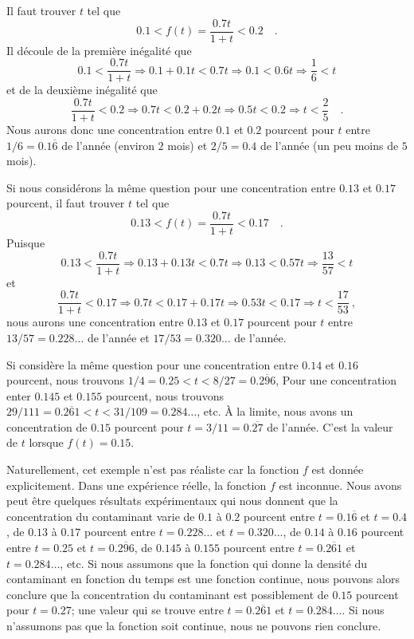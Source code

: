 {\begin{egg}[\life]
Il faut trouver $t$ tel que
\[
  0.1 < f(t) = \frac{0.7t}{1+t} < 0.2 \quad .
\]
Il découle de la première inégalité que
\[
  0.1 < \frac{0.7t}{1+t} \Rightarrow 0.1 + 0.1 t < 0.7 t
  \Rightarrow 0.1 < 0.6 t \Rightarrow \frac{1}{6} < t
\]
et de la deuxième inégalité que
\[
  \frac{0.7t}{1+t} < 0.2 \Rightarrow 0.7 t < 0.2 + 0.2 t
  \Rightarrow 0.5 t < 0.2 \Rightarrow t < \frac{2}{5} \quad .
\]
Nous aurons donc une concentration entre $0.1$ et $0.2$ pourcent pour
$t$ entre $1/6 = 0.1\overline{6}$ de l'année (environ $2$ mois) et
$2/5 = 0.4$ de l'année (un peu moins de $5$ mois).

Si nous considérons la même question pour une concentration entre $0.13$
et $0.17$ pourcent, il faut trouver $t$ tel que
\[
  0.13 < f(t) = \frac{0.7t}{1+t} < 0.17 \quad .
\]
Puisque
\[
  0.13 < \frac{0.7t}{1+t} \Rightarrow 0.13 + 0.13 t < 0.7 t
  \Rightarrow 0.13 < 0.57 t \Rightarrow \frac{13}{57} < t
\]
et
\[
  \frac{0.7t}{1+t} < 0.17 \Rightarrow 0.7 t < 0.17 + 0.17 t
  \Rightarrow 0.53 t < 0.17 \Rightarrow t < \frac{17}{53} \ ,
\]
nous aurons une concentration entre $0.13$ et $0.17$ pourcent pour $t$
entre $13/57 =0.228\ldots$ de l'année et $17/53 = 0.320\ldots$ de l'année.

Si considère la même question pour une concentration entre $0.14$
et $0.16$ pourcent, nous trouvons $1/4 = 0.25 < t < 8/27 = 0.\overline{296}$,
Pour une concentration enter $0.145$ et $0.155$ pourcent, nous trouvons
$29/111 = 0.\overline{261} < t < 31/109 = 0.284\ldots$, etc.  À la
limite, nous avons un concentration de $0.15$ pourcent pour
$t = 3/11 = 0.\overline{27}$ de l'année.   C'est la valeur de $t$
lorsque $f(t) = 0.15$.

Naturellement, cet exemple n'est pas réaliste car la fonction $f$ est
donnée explicitement.  Dans une expérience réelle, la fonction $f$ est
inconnue.  Nous avons peut être quelques résultats expérimentaux 
qui nous donnent que la concentration du contaminant varie de $0.1$ à
$0.2$ pourcent entre $t=0.1\overline{6}$ et $t = 0.4$, de $0.13$ à
$0.17$ pourcent entre $t =0.228\ldots$ et $t = 0.320\ldots$, 
de $0.14$ à $0.16$ pourcent entre $t = 0.25$ et $t = 0.\overline{296}$,
de $0.145$ à $0.155$ pourcent entre $t = 0.\overline{261}$ et
$t = 0.284\ldots$, etc.  Si nous assumons que la fonction qui donne la
densité du contaminant en fonction du temps est une fonction continue,
nous pouvons alors conclure que la concentration du contaminant est
possiblement de $0.15$ pourcent pour $t=0.27$; une valeur qui se
trouve entre $t = 0.\overline{261}$ et $t = 0.284\ldots$.  Si nous
n'assumons pas que la fonction soit continue, nous ne pouvons rien
conclure.
\end{egg}

}
